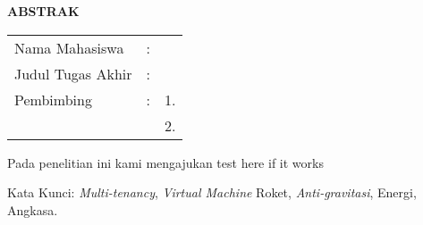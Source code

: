 \begin{center}
  \large\textbf{ABSTRAK}
\end{center}


\vspace{2ex}

\begingroup
\setlength{\tabcolsep}{0pt}

\noindent
\begin{tabularx}{\textwidth}{l >{\centering}m{2em} X}
  Nama Mahasiswa    & : & \name{}         \\

  Judul Tugas Akhir & : & \tatitle{}      \\

  Pembimbing        & : & 1. \advisor{}   \\
                    &   & 2. \coadvisor{} \\
\end{tabularx}
\endgroup

Pada penelitian ini kami mengajukan test here if it works \lipsum[1]

Kata Kunci: \emph{Multi-tenancy}, \emph{Virtual Machine} Roket, \emph{Anti-gravitasi}, Energi, Angkasa.
